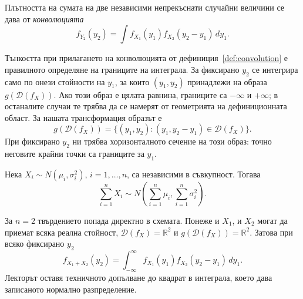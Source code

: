 \begin{defn}[конволюция]\label{def:convolution}
Плътността на сумата на две независими непрекъснати случайни величини се дава от \emph{конволюцията}
\[
f_{Y_2}(y_2) = \int f_{X_1}(y_1) f_{X_2}(y_2 - y_1) \, dy_1 .
\]
\end{defn}

Тънкостта при прилагането на конволюцията от дефиниция~\ref{def:convolution} е правилното определяне на границите на интеграла. За фиксирано $y_2$ се интегрира само по онези стойности на $y_1$, за които $(y_1,y_2)$ принадлежи на образа $g(\mathcal{D}(f_X))$. Ако този образ е цялата равнина, границите са $-\infty$ и $+\infty$; в останалите случаи те трябва да се намерят от геометрията на дефиниционната област.
За нашата трансформация образът е
\[
g(\mathcal{D}(f_X))
=\{(y_1,y_2):(y_1,y_2-y_1)\in\mathcal{D}(f_X)\}.
\]
При фиксирано $y_2$ ни трябва хоризонталното сечение на този образ: точно неговите крайни точки са границите за $y_1$.

\begin{prop}
Нека $X_i\sim N(\mu_i,\sigma_i^2)$, $i=1,\dots,n$, са независими в съвкупност. Тогава
\[
\sum_{i=1}^n X_i
\sim N\!\left(\sum_{i=1}^n\mu_i,\sum_{i=1}^n\sigma_i^2\right).
\]
\end{prop}

За $n=2$ твърдението попада директно в схемата. Понеже и $X_1$, и $X_2$ могат да приемат всяка реална стойност, $\mathcal{D}(f_X)=\mathbb{R}^2$ и $g(\mathcal{D}(f_X))=\mathbb{R}^2$. Затова при всяко фиксирано $y_2$
\[
f_{X_1+X_2}(y_2)
=\int_{-\infty}^{\infty}
f_{X_1}(y_1)f_{X_2}(y_2-y_1)\,dy_1.
\]
Лекторът оставя техничното допълване до квадрат в интеграла, което дава записаното нормално разпределение.

